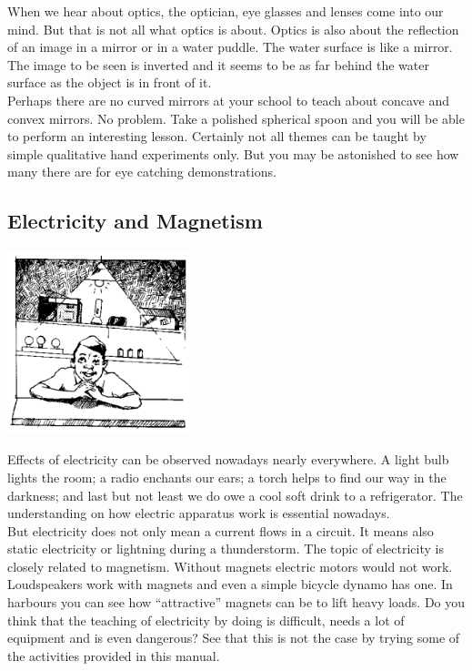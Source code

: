 \begin{multicols}{2}
When we hear about optics, the optician, eye glasses and lenses come into our mind. But that
is not all what optics is about. Optics is also about the reflection of an image in a mirror or in a
water puddle. The water surface is like a mirror. The image to be seen is inverted and it
seems to be as far behind the water surface as the object is in front of it.\\

Perhaps there are no curved mirrors at your school to teach about concave and convex mirrors. No problem. Take a polished spherical spoon and you will be able to perform an interesting lesson. Certainly not all themes can be taught by simple qualitative hand experiments only. But you may be astonished to see how many there are for eye catching demonstrations.

\subsection{Electricity and Magnetism}

\begin{center}
\includegraphics[width=0.4\textwidth]{./img/source/elec-mag.png}
\end{center}

Effects of electricity can be observed nowadays nearly everywhere. A light bulb lights the
room; a radio enchants our ears; a torch helps to find our way in the darkness; and last but
not least we do owe a cool soft drink to a refrigerator. The understanding on how electric
apparatus work is essential nowadays.\\

But electricity does not only mean a current flows in a circuit. It means also static electricity or lightning during a thunderstorm. The topic of electricity is closely related to magnetism.
Without magnets electric motors would not work. Loudspeakers work with magnets and even
a simple bicycle dynamo has one. In harbours you can see how ``attractive'' magnets can be
to lift heavy loads. Do you think that the teaching of electricity by doing is difficult, needs a lot
of equipment and is even dangerous? See that this is not the case by trying some of the activities provided in this manual.



\end{multicols}

\pagebreak